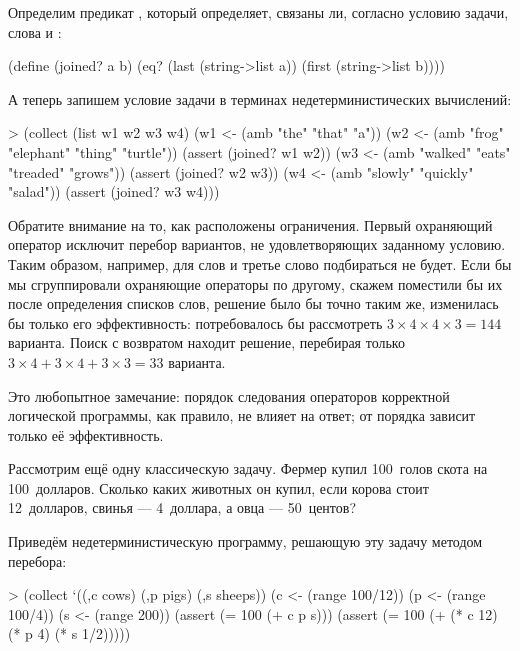 Определим предикат , который определяет, связаны ли, согласно условию задачи, слова  и :
\begin{SchemeCode}[emph={a,b}]
(define (joined? a b)
  (eq? (last (string->list a)) 
       (first (string->list b))))
\end{SchemeCode}

А теперь запишем условие задачи в терминах недетерминистических вычислений:

\begin{SchemeCode}[emph={w1,w2,w3,w4}]
> (collect (list w1 w2 w3 w4)
    (w1 <- (amb "the" "that" "a"))
    (w2 <- (amb "frog" "elephant" "thing" "turtle"))
    (assert (joined? w1 w2))
    (w3 <- (amb "walked" "eats" "treaded" "grows"))
    (assert (joined? w2 w3))
    (w4 <- (amb "slowly" "quickly" "salad"))
    (assert (joined? w3 w4)))%
\end{SchemeCode}

Обратите внимание на то, как расположены ограничения. Первый охраняющий оператор  исключит перебор вариантов, не удовлетворяющих заданному условию. Таким образом, например, для слов  и  третье слово подбираться не будет. Если бы мы сгруппировали охраняющие операторы по другому, скажем поместили бы их после определения списков слов, решение было бы точно таким же, изменилась бы только его эффективность: потребовалось бы рассмотреть $3\times4\times4\times3=144$ варианта. Поиск с возвратом находит решение, перебирая только $3\times4+3\times4+3\times3=33$ варианта.

Это любопытное замечание: порядок следования операторов корректной логической программы, как правило, не влияет на ответ; от порядка зависит только её эффективность.

Рассмотрим ещё одну классическую задачу. Фермер купил 100~голов скота на 100~долларов. Сколько каких животных он купил, если корова стоит 12~долларов, свинья --- 4~доллара, а овца --- 50~центов?

Приведём недетерминистическую программу, решающую эту задачу методом перебора:

\begin{SchemeCode}[emph={c,p,s}]
   > (collect `((,c cows) (,p pigs) (,s sheeps))
      (c <- (range 100/12))
      (p <- (range 100/4))
      (s <- (range 200))
      (assert (= 100 (+ c p s)))
      (assert (= 100 (+ (* c 12) (* p 4) (* s 1/2)))))
\end{SchemeCode}


